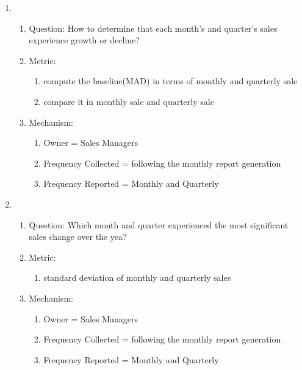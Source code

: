 \documentclass[12pt,letterpaper]{report}
\begin{document}
\begin{enumerate}
\item
    \begin{enumerate}
    \item Question: How to determine that each month's and quarter’s  sales experience growth or decline?
    \item Metric: 
        \begin{enumerate}
            \item compute the baseline(MAD) in terms of monthly and quarterly sale
            \item compare it in monthly sale and quarterly sale
        \end{enumerate}
    \item Mechanism:
	\begin{enumerate}
    \item Owner = Sales Managers
    \item Frequency Collected = following the monthly report generation
    \item Frequency Reported = Monthly and Quarterly
    \end{enumerate}
\end{enumerate}

\item
    \begin{enumerate}
    \item Question: Which month and quarter experienced the most significant sales change over the yea?
    \item Metric: 
        \begin{enumerate}
            \item  standard deviation of monthly and quarterly sales
        \end{enumerate}
    \item Mechanism:
	\begin{enumerate}
    \item Owner = Sales Managers
    \item Frequency Collected = following the monthly report generation
    \item Frequency Reported = Monthly and Quarterly
    \end{enumerate}
\end{enumerate}


\end{enumerate}
\end{document}
